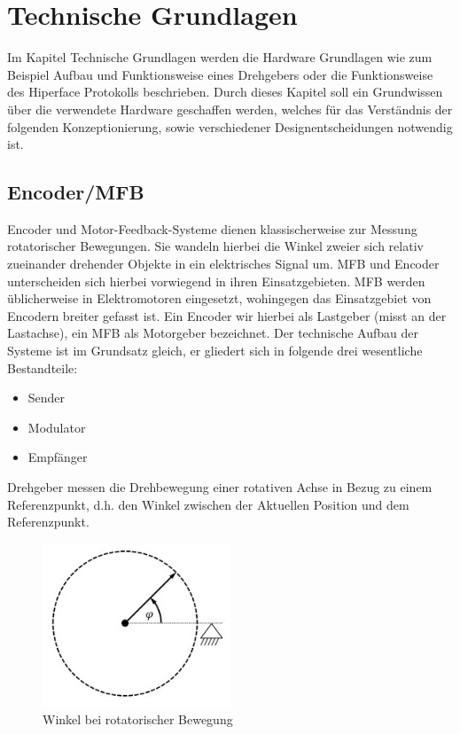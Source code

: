 \cleardoublepage





\newpage
\section{Technische Grundlagen}
Im Kapitel Technische Grundlagen werden die Hardware Grundlagen wie zum Beispiel Aufbau und Funktionsweise eines Drehgebers oder die Funktionsweise des Hiperface Protokolls beschrieben. Durch dieses Kapitel soll ein Grundwissen über die verwendete Hardware geschaffen werden, welches für das Verständnis der folgenden Konzeptionierung, sowie verschiedener Designentscheidungen notwendig ist.
\subsection{Encoder/MFB}
Encoder und Motor-Feedback-Systeme dienen klassischerweise zur Messung rotatorischer Bewegungen. Sie wandeln hierbei die Winkel zweier sich relativ zueinander drehender Objekte in ein elektrisches Signal um. \ac{MFB} und Encoder unterscheiden sich hierbei vorwiegend in ihren Einsatzgebieten. \ac{MFB} werden üblicherweise in Elektromotoren eingesetzt, wohingegen das Einsatzgebiet von Encodern breiter gefasst ist. Ein Encoder wir hierbei als Lastgeber (misst an der Lastachse), ein \ac{MFB} als Motorgeber bezeichnet.\cite[S.1]{Basler.2016}
Der technische Aufbau der Systeme ist im Grundsatz gleich, er gliedert sich in folgende drei wesentliche Bestandteile:
\begin{itemize}
	\item Sender
	\item Modulator
	\item Empfänger
\end{itemize}
Drehgeber messen die Drehbewegung einer rotativen Achse in Bezug zu einem Referenzpunkt, d.h. den Winkel zwischen der Aktuellen Position und dem Referenzpunkt.
  \begin{figure}[h]
        \centering
        \includegraphics[width=0.5\textwidth]{img/Winkel_bei_rot_Bewegung.jpg} 
        \caption[Winkel bei rotatorischer Bewegung]{Winkel bei rotatorischer Bewegung\cite{Basler.2016}}
        \label{fig:Winkel_bei_rot_Bewegung.jpg}
    \end{figure}
